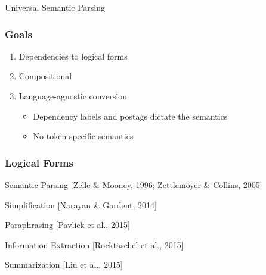 \documentclass[mathserif,12pt]{beamer}
\begin{document}
\begin{frame}
\Large
\centering
\vspace{1.5em}
Universal Semantic Parsing
\end{frame}

\begin{frame}
\frametitle{Goals}
\Large
\begin{enumerate}
\item Dependencies to logical forms
\vspace{1em}
\item Compositional
\vspace{1em}
\item Language-agnostic conversion
\begin{itemize}
  \large
  \vspace{1em}
  \item Dependency labels and postags dictate the semantics
  \vspace{1em}
  \item No token-specific semantics
\end{itemize}
\end{enumerate}

\end{frame}

\begin{frame}
 \frametitle{Logical Forms}
\large
Semantic Parsing {\scriptsize [Zelle \& Mooney, 1996; Zettlemoyer \& Collins, 2005]}
 
 \vspace{1em}
Simplification {\scriptsize [Narayan \& Gardent, 2014]}
 
 \vspace{1em}
Paraphrasing {\scriptsize [Pavlick et al., 2015]}
 
 \vspace{1em}
Information Extraction {\scriptsize [Rockt\"aschel et al., 2015]}
 
 \vspace{1em}
Summarization {\scriptsize [Liu et al., 2015]}
\end{frame}
\end{document}
